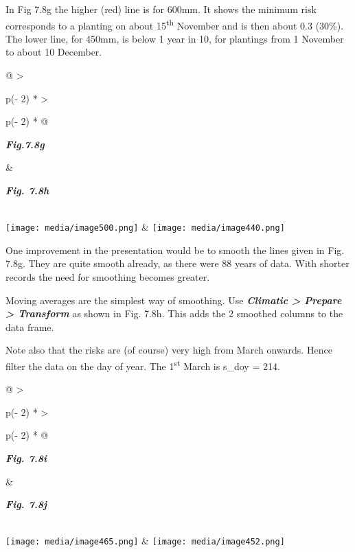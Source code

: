 \documentclass[
  letterpaper,
  DIV=11,
  numbers=noendperiod]{scrreprt}
\begin{document}
In Fig 7.8g the higher (red) line is for 600mm. It shows the minimum
risk corresponds to a planting on about 15\textsuperscript{th} November
and is then about 0.3 (30\%). The lower line, for 450mm, is below 1 year
in 10, for plantings from 1 November to about 10 December.

\begin{longtable}[]{@{}
  >{\raggedright\arraybackslash}p{(\columnwidth - 2\tabcolsep) * }
  >{\raggedright\arraybackslash}p{(\columnwidth - 2\tabcolsep) * }@{}}
\toprule\noalign{}
\begin{minipage}[b]{\linewidth}\raggedright
\textbf{\emph{Fig.7.8g}}
\end{minipage} & \begin{minipage}[b]{\linewidth}\raggedright
\textbf{\emph{Fig. 7.8h}}
\end{minipage} \\
\midrule\noalign{}
\endhead
\bottomrule\noalign{}
\endlastfoot
\texttt{[image: media/image500.png]} &
\texttt{[image: media/image440.png]} \\
\end{longtable}

One improvement in the presentation would be to smooth the lines given
in Fig. 7.8g. They are quite smooth already, as there were 88 years of
data. With shorter records the need for smoothing becomes greater.

Moving averages are the simplest way of smoothing. Use
\textbf{\emph{Climatic \textgreater{} Prepare \textgreater{} Transform}}
as shown in Fig. 7.8h. This adds the 2 smoothed columns to the data
frame.

Note also that the risks are (of course) very high from March onwards.
Hence filter the data on the day of year. The 1\textsuperscript{st}
March is s\_doy = 214.

\begin{longtable}[]{@{}
  >{\raggedright\arraybackslash}p{(\columnwidth - 2\tabcolsep) * }
  >{\raggedright\arraybackslash}p{(\columnwidth - 2\tabcolsep) * }@{}}
\toprule\noalign{}
\begin{minipage}[b]{\linewidth}\raggedright
\textbf{\emph{Fig. 7.8i}}
\end{minipage} & \begin{minipage}[b]{\linewidth}\raggedright
\textbf{\emph{Fig. 7.8j}}
\end{minipage} \\
\midrule\noalign{}
\endhead
\bottomrule\noalign{}
\endlastfoot
\texttt{[image: media/image465.png]} &
\texttt{[image: media/image452.png]} \\
\end{longtable}
\end{document}

